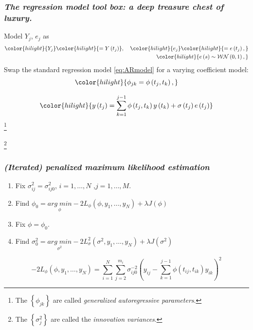 \documentclass[12pt]{beamer}
\newcommand{\ms}{\scriptscriptstyle}
\newcommand{\newmaththought}[1]{{ \color{hilight} {#1}}}
\newcommand\myfootnote[1]{%
  \begingroup
  \renewcommand\thefootnote{}\footnote{#1}%
  \addtocounter{footnote}{-1}%
  \endgroup
}
\begin{document}
\begin{frame}
\frametitle{\emph{The regression model tool box: a deep treasure chest of luxury.}}
Model $Y_j$, $e_j$ as
\begin{align*}
\begin{split}
\newmaththought{Y_j}  \newmaththought{= Y\left( t_j \right) },\quad \newmaththought{e_j}  \newmaththought{= e\left( t_j \right),}\\
\newmaththought{e\left(s\right) \sim  \mathcal{WN}\left(0,1\right),}
\end{split}
\end{align*}
\noindent
Swap the standard regression model \ref{eq:ARmodel} for a varying coefficient model:
\begin{equation*}
\newmaththought{\phi_{jk} = \phi\left(t_j,t_k\right),}
\end{equation*}

\begin{equation}   
\newmaththought{y\left(t_j \right)  = \sum_{k=1}^{j-1} \phi\left(t_j ,t_k\right) y\left(t_k\right) + \sigma\left(t_j\right)e\left({t_j}\right)}
\label{eq:MyModel} 
\end{equation}
\myfootnote{The $\left\{ \phi_{jk} \right\}$ are called \emph{generalized autoregressive parameters}.}
\myfootnote{The $\left\{ \sigma^{\ms 2}_{j} \right\}$ are called the \emph{innovation variances}.}
\end{frame}



\begin{frame}
\frametitle{\emph{(Iterated) penalized maximum likelihood estimation}}

\begin{enumerate}
\item Fix $\sigma_{ij}^{\ms 2} = \sigma_{ij0}^{\ms 2}$, $i=1,\dots,N$ ,$j=1,\dots,M$.
\item Find $\phi_0 = \underset{\phi}{arg \; min} -2L_\phi\left(\phi, y_1,\dots, y_N \right) + \lambda J\left( \phi \right)$
\item Fix $\phi = \phi_{0}$.
\item Find  $\sigma_{0}^{\ms 2} = \underset{\sigma^{\ms 2}}{arg\; min} -2L_\sigma^{\ms 2}\left(\sigma^{\ms 2}, y_1,\dots, y_N \right) + \lambda J\left( \sigma^{\ms 2} \right)$
\end{enumerate}

\begin{adjustwidth}{-2cm}{-2cm}
\begin{equation}
-2 L_\phi\left(\phi, y_1, \dots,y_N \right) = \sum_{i=1}^N \sum_{j=2}^{m_i} \sigma_{ij0}^{-2} \left(y_{ij} - \sum_{k=1}^{j-1}\phi\left({t_{ij},t_{ik}}\right)y_{ik} \right)^{\ms 2} \label{loglikelihood}
\end{equation}
\end{adjustwidth}
\end{frame}
\end{document}
